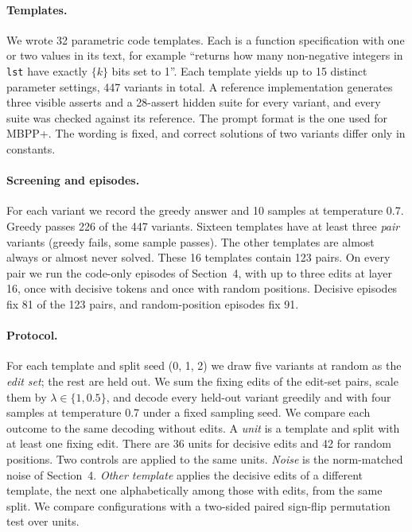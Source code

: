 \documentclass[11pt]{article}
\begin{document}
\paragraph{Templates.}
We wrote 32 parametric code templates. Each is a function specification with one or two values in its text, for example ``returns how many non-negative integers in \texttt{lst} have exactly $\{k\}$ bits set to 1''. Each template yields up to 15 distinct parameter settings, 447 variants in total. A reference implementation generates three visible asserts and a 28-assert hidden suite for every variant, and every suite was checked against its reference. The prompt format is the one used for MBPP+. The wording is fixed, and correct solutions of two variants differ only in constants.

\paragraph{Screening and episodes.}
For each variant we record the greedy answer and 10 samples at temperature 0.7. Greedy passes 226 of the 447 variants. Sixteen templates have at least three \emph{pair} variants (greedy fails, some sample passes). The other templates are almost always or almost never solved. These 16 templates contain 123 pairs. On every pair we run the code-only episodes of Section~4, with up to three edits at layer 16, once with decisive tokens and once with random positions. Decisive episodes fix 81 of the 123 pairs, and random-position episodes fix 91.

\paragraph{Protocol.}
For each template and split seed (0, 1, 2) we draw five variants at random as the \emph{edit set}; the rest are held out. We sum the fixing edits of the edit-set pairs, scale them by $\lambda\in\{1,0.5\}$, and decode every held-out variant greedily and with four samples at temperature 0.7 under a fixed sampling seed. We compare each outcome to the same decoding without edits. A \emph{unit} is a template and split with at least one fixing edit. There are 36 units for decisive edits and 42 for random positions. Two controls are applied to the same units. \emph{Noise} is the norm-matched noise of Section~4. \emph{Other template} applies the decisive edits of a different template, the next one alphabetically among those with edits, from the same split. We compare configurations with a two-sided paired sign-flip permutation test over units.
\end{document}
